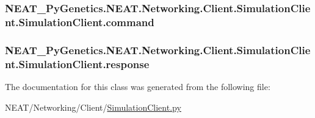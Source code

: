 \subsubsection[{\texorpdfstring{command}{command}}]{\setlength{\rightskip}{0pt plus 5cm}N\+E\+A\+T\+\_\+\+Py\+Genetics.\+N\+E\+A\+T.\+Networking.\+Client.\+Simulation\+Client.\+Simulation\+Client.\+command\hspace{0.3cm}{\ttfamily [static]}}\hypertarget{classNEAT__PyGenetics_1_1NEAT_1_1Networking_1_1Client_1_1SimulationClient_1_1SimulationClient_ae492ae862d9d7a5096f16051c4b43cb0}{}\label{classNEAT__PyGenetics_1_1NEAT_1_1Networking_1_1Client_1_1SimulationClient_1_1SimulationClient_ae492ae862d9d7a5096f16051c4b43cb0}
\subsubsection[{\texorpdfstring{response}{response}}]{\setlength{\rightskip}{0pt plus 5cm}N\+E\+A\+T\+\_\+\+Py\+Genetics.\+N\+E\+A\+T.\+Networking.\+Client.\+Simulation\+Client.\+Simulation\+Client.\+response\hspace{0.3cm}{\ttfamily [static]}}\hypertarget{classNEAT__PyGenetics_1_1NEAT_1_1Networking_1_1Client_1_1SimulationClient_1_1SimulationClient_a6a2ac9e9e4603999962e160328eaffce}{}\label{classNEAT__PyGenetics_1_1NEAT_1_1Networking_1_1Client_1_1SimulationClient_1_1SimulationClient_a6a2ac9e9e4603999962e160328eaffce}


The documentation for this class was generated from the following file\+:\begin{DoxyCompactItemize}
\item 
N\+E\+A\+T/\+Networking/\+Client/\hyperlink{SimulationClient_8py}{Simulation\+Client.\+py}\end{DoxyCompactItemize}
